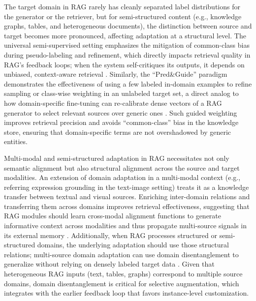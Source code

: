 \documentclass[11pt]{article}
\begin{document}
The target domain in RAG rarely has cleanly separated label distributions for the generator or the retriever, but for semi-structured content (e.g., knowledge graphs, tables, and heterogeneous documents), the distinction between source and target becomes more pronounced, affecting adaptation at a structural level. The universal semi-supervised setting emphasizes the mitigation of common-class bias during pseudo-labeling and refinement, which directly impacts retrieval quality in RAG's feedback loops; when the system self-critiques its outputs, it depends on unbiased, context-aware retrieval \cite{ref114}. Similarly, the ``Pred\&Guide'' paradigm demonstrates the effectiveness of using a few labeled in-domain examples to refine sampling or class-wise weighting in an unlabeled target set, a direct analog to how domain-specific fine-tuning can re-calibrate dense vectors of a RAG generator to select relevant sources over generic ones \cite{ref115}. Such guided weighting improves retrieval precision and avoids ``common-class'' bias in the knowledge store, ensuring that domain-specific terms are not overshadowed by generic entities.

Multi-modal and semi-structured adaptation in RAG necessitates not only semantic alignment but also structural alignment across the source and target modalities. An extension of domain adaptation in a multi-modal context (e.g., referring expression grounding in the text-image setting) treats it as a knowledge transfer between textual and visual sources. Enriching inter-domain relations and transferring them across domains improves retrieval effectiveness, suggesting that RAG modules should learn cross-modal alignment functions to generate informative context across modalities and thus propagate multi-source signals in its external memory \cite{ref116}. Additionally, when RAG processes structured or semi-structured domains, the underlying adaptation should use those structural relations; multi-source domain adaptation can use domain disentanglement to generalize without relying on densely labeled target data \cite{ref117}. Given that heterogeneous RAG inputs (text, tables, graphs) correspond to multiple source domains, domain disentanglement is critical for selective augmentation, which integrates with the earlier feedback loop that favors instance-level customization.
\end{document}
